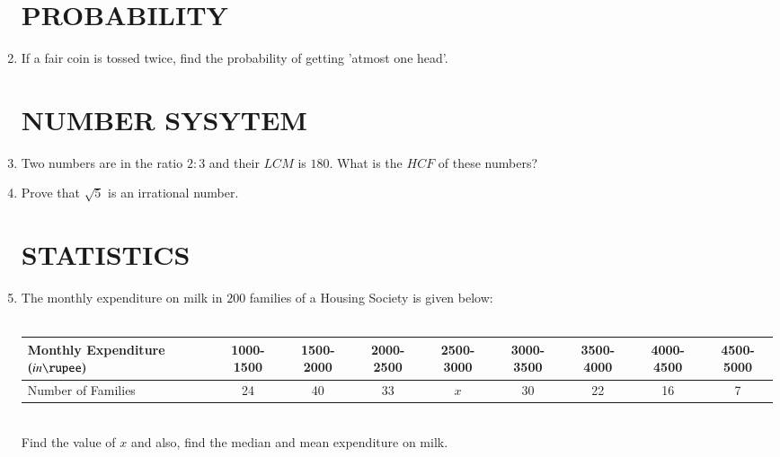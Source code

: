 \documentclass[12pt,-letter paper]{article}
\providecommand{\brak}[1]{\ensuremath{\left(#1\right)}}
\begin{document}
\begin{enumerate}
\section*{PROBABILITY}
\item
If a fair coin is tossed twice, find the probability of getting 'atmost one head'.
\section*{NUMBER SYSYTEM}
\item
Two numbers are in the ratio $2:3$ and their $LCM$ is $180$. What is the $HCF$ of these numbers?
\item
Prove that $\sqrt{5}$ is an irrational number.
\section*{STATISTICS}
\item
The monthly expenditure on milk in $200$ families of a Housing Society is given below:\\
\\
\footnotesize
\setlength{\tabcolsep}{1pt}
\begin{tabular}{|l|c|c|c|c|c|c|c|c|}
\hline
	Monthly Expenditure \brak{in \rupee} & 1000-1500 & 1500-2000 & 2000-2500 & 2500-3000 & 3000-3500 & 3500-4000 & 4000-4500 & 4500-5000 \\ \hline
Number of Families & 24 & 40 & 33 & $x$ & 30 & 22 & 16 & 7 \\ \hline
\end{tabular}\\

Find the value of $x$ and also, find the median and mean expenditure on milk.



\end{enumerate}
\end{document}
